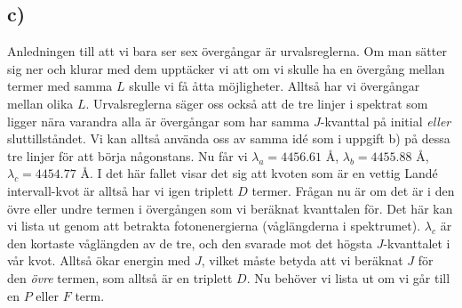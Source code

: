 \subsection{c)}
Anledningen till att vi bara ser sex övergångar är urvalsreglerna. Om man sätter sig ner och klurar med dem upptäcker vi att 
om vi skulle ha en övergång mellan termer med samma $L$ skulle vi få åtta möjligheter. Alltså har vi övergångar mellan olika $L$.
Urvalsreglerna säger oss också att de tre linjer i spektrat som ligger nära varandra alla är övergångar som har samma $J$-kvanttal på initial \emph{eller}
sluttillståndet. Vi kan alltså använda oss av samma idé som i uppgift b) på dessa tre linjer för att börja någonstans. Nu får vi 
$\lambda_a = 4456.61$ Å, $\lambda_b = 4455.88$ Å, $\lambda_c = 4454.77$ Å. I det här fallet visar det sig att kvoten som är en vettig Landé intervall-kvot 
är 
alltså har vi igen triplett $D$ termer. Frågan nu är om det är i den övre eller undre termen i övergången som vi beräknat kvanttalen för. Det här kan vi lista ut genom att betrakta fotonenergierna (våglängderna i spektrumet). $\lambda_c$ är den kortaste våglängden av de tre, och den svarade mot det högsta $J$-kvanttalet i vår kvot.
Alltså ökar energin med $J$, vilket måste betyda att vi beräknat $J$ för den \emph{övre} termen, som alltså är en triplett $D$. Nu behöver vi lista ut om vi 
går till en $P$ eller $F$ term.